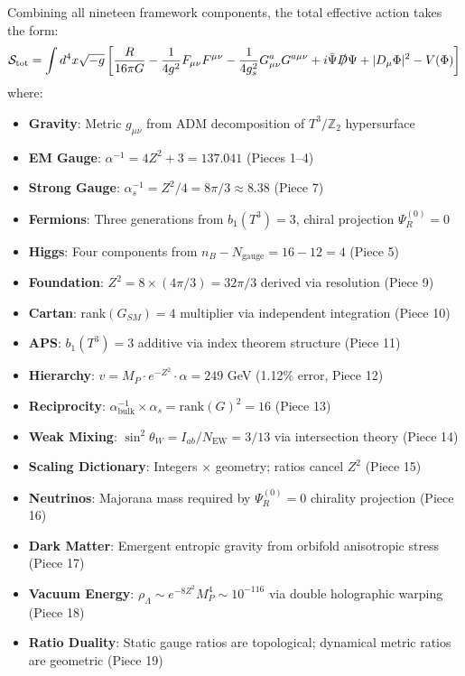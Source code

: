 \documentclass[12pt,a4paper]{article}
\newcommand{\Ztwo}{\mathbb{Z}_2}
\newcommand{\Tthree}{T^3}
\newcommand{\sinW}{\sin^2\theta_W}
\newcommand{\Zsq}{Z^2}
\begin{document}
Combining all nineteen framework components, the total effective action takes the form:
\begin{equation}
\mathcal{S}_{\text{tot}} = \int d^4x \sqrt{-g} \left[ \frac{R}{16\pi G} - \frac{1}{4g^2}F_{\mu\nu}F^{\mu\nu} - \frac{1}{4g_s^2}G^a_{\mu\nu}G^{a\mu\nu} + i\bar{\Psi}\slashed{D}\Psi + |D_\mu\Phi|^2 - V(\Phi) \right]
\end{equation}
where:
\begin{itemize}[itemsep=0pt]
    \item \textbf{Gravity}: Metric $g_{\mu\nu}$ from ADM decomposition of $\Tthree/\Ztwo$ hypersurface
    \item \textbf{EM Gauge}: $\alpha^{-1} = 4\Zsq + 3 = 137.041$ (Pieces 1--4)
    \item \textbf{Strong Gauge}: $\alpha_s^{-1} = \Zsq/4 = 8\pi/3 \approx 8.38$ (Piece 7)
    \item \textbf{Fermions}: Three generations from $b_1(T^3) = 3$, chiral projection $\Psi_R^{(0)} = 0$
    \item \textbf{Higgs}: Four components from $n_B - N_{\text{gauge}} = 16 - 12 = 4$ (Piece 5)
    \item \textbf{Foundation}: $\Zsq = 8 \times (4\pi/3) = 32\pi/3$ derived via resolution (Piece 9)
    \item \textbf{Cartan}: rank$(G_{SM}) = 4$ multiplier via independent integration (Piece 10)
    \item \textbf{APS}: $b_1(T^3) = 3$ additive via index theorem structure (Piece 11)
    \item \textbf{Hierarchy}: $v = M_P \cdot e^{-\Zsq} \cdot \alpha = 249$ GeV (1.12\% error, Piece 12)
    \item \textbf{Reciprocity}: $\alpha^{-1}_{\text{bulk}} \times \alpha_s = \text{rank}(G)^2 = 16$ (Piece 13)
    \item \textbf{Weak Mixing}: $\sinW = I_{ab}/N_{\text{EW}} = 3/13$ via intersection theory (Piece 14)
    \item \textbf{Scaling Dictionary}: Integers $\times$ geometry; ratios cancel $\Zsq$ (Piece 15)
    \item \textbf{Neutrinos}: Majorana mass required by $\Psi_R^{(0)} = 0$ chirality projection (Piece 16)
    \item \textbf{Dark Matter}: Emergent entropic gravity from orbifold anisotropic stress (Piece 17)
    \item \textbf{Vacuum Energy}: $\rho_\Lambda \sim e^{-8\Zsq} M_P^4 \sim 10^{-116}$ via double holographic warping (Piece 18)
    \item \textbf{Ratio Duality}: Static gauge ratios are topological; dynamical metric ratios are geometric (Piece 19)
\end{itemize}
\end{document}
